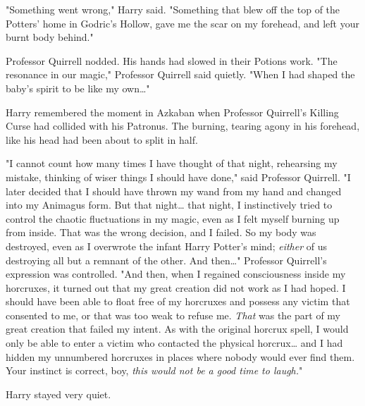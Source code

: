 "Something went wrong," Harry said. "Something that blew off the top of the 
Potters' home in Godric's Hollow, gave me the scar on my forehead, and left 
your burnt body behind."

Professor Quirrell nodded. His hands had slowed in their Potions work. "The 
resonance in our magic," Professor Quirrell said quietly. "When I had shaped 
the baby's spirit to be like my own{\ldots}"

Harry remembered the moment in Azkaban when Professor Quirrell's Killing Curse 
had collided with his Patronus. The burning, tearing agony in his forehead, 
like his head had been about to split in half.

"I cannot count how many times I have thought of that night, rehearsing my 
mistake, thinking of wiser things I should have done," said Professor Quirrell. 
"I later decided that I should have thrown my wand from my hand and changed 
into my Animagus form. But that night{\ldots} that night, I instinctively tried 
to control the chaotic fluctuations in my magic, even as I felt myself burning 
up from inside. That was the wrong decision, and I failed. So my body was 
destroyed, even as I overwrote the infant Harry Potter's mind; \emph{either} of 
us destroying all but a remnant of the other. And then{\ldots}" Professor 
Quirrell's expression was controlled. "And then, when I regained consciousness 
inside my horcruxes, it turned out that my great creation did not work as I had 
hoped. I should have been able to float free of my horcruxes and possess any 
victim that consented to me, or that was too weak to refuse me. \emph{That} was 
the part of my great creation that failed my intent. As with the original 
horcrux spell, I would only be able to enter a victim who contacted the 
physical horcrux{\ldots} and I had hidden my unnumbered horcruxes in places 
where nobody would ever find them. Your instinct is correct, boy, \emph{this 
would not be a good time to laugh.}"

Harry stayed very quiet.

